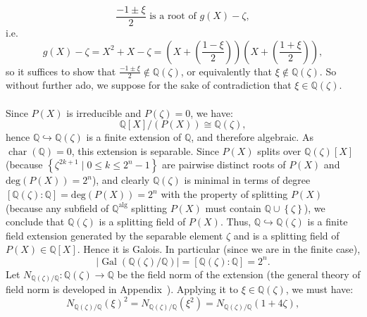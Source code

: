\begin{solution}
    \[
        \frac{-1 \pm \xi}{2} \text{ is a root of } g\left(X\right)-\zeta,
    \]
    i.e.
    \[
        g\left(X\right)-\zeta=X^2+X-\zeta = \left(X+\left(\frac{1-\xi}{2}\right)\right)\left(X+\left(\frac{1+\xi}{2}\right)\right),
    \]
    so it suffices to show that \( \frac{-1 \pm \xi}{2} \notin \mathbb{Q}\left(\zeta\right) \), or equivalently that \( \xi \notin \mathbb{Q}\left(\zeta\right) \). So without further ado, we suppose for the sake of contradiction that \( \xi \in \mathbb{Q}\left(\zeta\right) \).
    \\\\
    Since \( P\left(X\right) \) is irreducible and \( P\left(\zeta\right) = 0 \), we have:
    \[
        \mathbb{Q}\left[X\right] / \left( P\left(X\right) \right) \cong \mathbb{Q} \left( \zeta \right),
    \]
    hence \( \mathbb{Q} \hookrightarrow \mathbb{Q} \left( \zeta \right) \) is a finite extension of \( \mathbb{Q} \), and therefore algebraic. As \( \operatorname{char} \left( \mathbb{Q} \right) = 0 \), this extension is separable. Since \( P\left(X\right) \) splits over \( \mathbb{Q} \left( \zeta \right)\left[X\right] \) (because \( \left\{\zeta^{2k+1}\mid 0\leq k\leq 2^{n}-1\right\} \) are pairwise distinct roots of \( P\left(X\right) \) and \( \mathrm{deg}\left(P\left(X\right)\right)=2^n \)), and clearly \( \mathbb{Q} \left( \zeta \right) \) is minimal in terms of degree \( \left[\mathbb{Q}\left(\zeta\right):\mathbb{Q}\right]=\mathrm{deg}\left(P\left(X\right)\right)=2^n \) with the property of splitting \( P\left(X\right) \) (because any subfield of \( \mathbb{Q}^{\text{alg}} \) splitting \( P\left(X\right) \) must contain \( \mathbb{Q}\cup\left\{\zeta\right\} \)), we conclude that \( \mathbb{Q} \left( \zeta \right) \) is a splitting field of \( P\left(X\right) \). Thus, \( \mathbb{Q} \hookrightarrow \mathbb{Q} \left( \zeta \right) \) is a finite field extension generated by the separable element \( \zeta \) and is a splitting field of \( P\left(X\right) \in \mathbb{Q}\left[X\right] \). Hence it is Galois. In particular (since we are in the finite case),
    \[
        \left| \operatorname{Gal} \left( \mathbb{Q}\left(\zeta\right)/\mathbb{Q} \right) \right|=\left[\mathbb{Q}\left(\zeta\right) : \mathbb{Q}\right] =2^n.
    \]
    Let \( N_{\mathbb{Q}\left(\zeta\right)/\mathbb{Q}} : \mathbb{Q}\left(\zeta\right) \rightarrow \mathbb{Q} \) be the field norm of the extension (the general theory of field norm is developed in Appendix~). Applying it to \( \xi \in \mathbb{Q}\left(\zeta\right) \), we must have:
    \[
        N_{\mathbb{Q}\left(\zeta\right)/\mathbb{Q}}\left(\xi\right)^2 = N_{\mathbb{Q}\left(\zeta\right)/\mathbb{Q}}\left( \xi^2 \right) = N_{\mathbb{Q}\left(\zeta\right)/\mathbb{Q}}\left(1 + 4\zeta\right),
\]
\end{solution}
